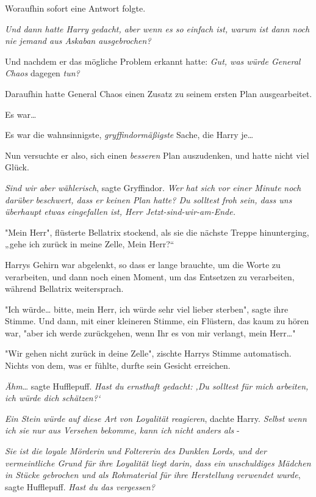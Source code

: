 {Woraufhin sofort eine Antwort folgte.

\emph{Und dann hatte Harry gedacht, \emph{aber wenn es} so \emph{einfach ist, warum ist} \emph{dann} \emph{noch nie jemand aus Askaban ausgebrochen?}}

Und nachdem er das mögliche Problem erkannt hatte: \emph{Gut, was würde General Chaos} dagegen \emph{tun?}

Daraufhin hatte General Chaos einen Zusatz zu seinem ersten Plan ausgearbeitet.

Es war…

Es war die wahnsinnigste, \emph{gryffindormäßigste} Sache, die Harry je…

Nun versuchte er also, sich einen \emph{besseren} Plan auszudenken, und hatte nicht viel Glück.

\emph{Sind wir aber wählerisch}, sagte Gryffindor. \emph{Wer} \emph{hat sich} \emph{vor einer Minute} \emph{noch} \emph{darüber} \emph{beschwert, dass er keinen Plan hatte? Du solltest froh sein, dass uns überhaupt etwas eingefallen ist, Herr Jetzt-sind-wir-am-Ende.}

"Mein Herr", flüsterte Bellatrix stockend, als sie die nächste Treppe hinunterging, „gehe ich zurück in meine Zelle, Mein Herr?“

Harrys Gehirn war abgelenkt, so dass er lange brauchte, um die Worte zu verarbeiten, und dann noch einen Moment, um das Entsetzen zu verarbeiten, während Bellatrix weitersprach.

"Ich würde… bitte, mein Herr, ich würde sehr viel lieber sterben", sagte ihre Stimme. Und dann, mit einer kleineren Stimme, ein Flüstern, das kaum zu hören war, "aber ich werde zurückgehen, wenn Ihr es von mir verlangt, mein Herr…"

"Wir gehen nicht zurück in deine Zelle", zischte Harrys Stimme automatisch. Nichts von dem, was er fühlte, durfte sein Gesicht erreichen.

\emph{Ähm}… sagte Hufflepuff. \emph{Hast du ernsthaft gedacht: ‚Du solltest für mich arbeiten, ich würde dich schätzen?`}

\emph{Ein Stein würde auf diese Art von Loyalität reagieren}, dachte Harry. \emph{Selbst wenn ich sie nur aus Versehen bekomme, kann ich nicht anders als} -

\emph{Sie ist die loyale Mörderin und Foltererin des Dunklen Lords, und der vermeintliche Grund für ihre Loyalität liegt darin, dass ein unschuldiges Mädchen in Stücke gebrochen und als Rohmaterial für ihre Herstellung verwendet wurde}, sagte Hufflepuff. \emph{Hast du das vergessen?}

}
